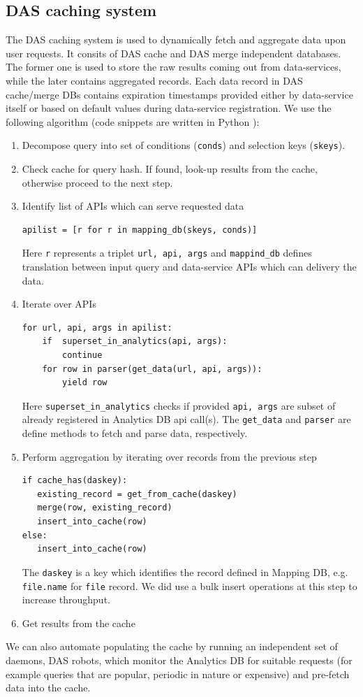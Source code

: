 \documentclass[1p,times]{elsarticle}
\begin{document}
\subsection{DAS caching system}
The DAS caching system is used to dynamically fetch
and aggregate data upon user requests. It consits of
DAS cache and DAS merge independent databases. The former one is used to store
the raw results coming out from data-services, while the later contains aggregated
records. Each data record in DAS cache/merge DBs contains expiration timestamps 
provided either by data-service itself or based on default values during 
data-service registration.
We use the following algorithm (code snippets are written in Python \cite{Python}):
\begin{enumerate}[1.]
\item Decompose query into set of conditions (\verb+conds+) 
and selection keys (\verb+skeys+).
\item Check cache for query hash. If found, look-up results from the cache,
otherwise proceed to the next step.
\item Identify list of APIs which can serve requested data
\begin{verbatim}
apilist = [r for r in mapping_db(skeys, conds)]
\end{verbatim}
Here \verb+r+ represents a triplet \verb+url, api, args+ and 
\verb+mappind_db+ defines translation between input query and data-service
APIs which can delivery the data.
\item Iterate over APIs
\begin{verbatim}
for url, api, args in apilist:
    if  superset_in_analytics(api, args):
        continue
    for row in parser(get_data(url, api, args)):
        yield row
\end{verbatim}
Here \verb+superset_in_analytics+ checks if provided \verb+api, args+
are subset of already registered in Analytics DB api call(s). The 
\verb+get_data+ and \verb+parser+ are define methods to fetch and parse
data, respectively.
\item Perform aggregation by iterating over records from the previous step
\begin{verbatim}
if cache_has(daskey):
   existing_record = get_from_cache(daskey)
   merge(row, existing_record)
   insert_into_cache(row)
else:
   insert_into_cache(row)
\end{verbatim}
The \verb+daskey+
is a key which identifies the record defined in Mapping DB, e.g. \verb+file.name+
for \verb+file+ record.
We did use a bulk insert operations at this step to increase throughput. 
\item Get results from the cache
\end{enumerate}
We can also automate populating the cache by running an 
independent set of daemons, DAS robots, which monitor the 
Analytics DB for suitable requests (for example queries that are 
popular, periodic in nature or expensive) and pre-fetch data into the cache. 
\end{document}
